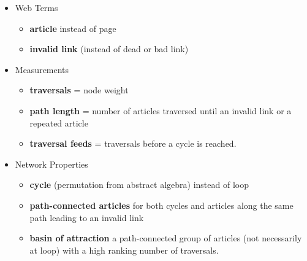 \documentclass[twoside]{article}
\newcommand{\bt}[1]{\textbf{#1}} %
\begin{document}
\begin{itemize}
\item Web Terms
    \begin{itemize}
        \item \bt{article} instead of page
        \item \bt{invalid link} (instead of dead or bad link)
    \end{itemize}
\item Measurements
    \begin{itemize}
        \item \bt{traversals} = node weight
        \item \bt{path length} = number of articles traversed until an invalid link or a repeated article
        \item \bt{traversal feeds} = traversals before a cycle is reached.
    \end{itemize}
\item Network Properties
    \begin{itemize}
        \item \bt{cycle} (permutation from abstract algebra) instead of loop
        \item \bt{path-connected articles} for both cycles and articles along the same path leading to an 
    invalid link
        \item \bt{basin of attraction} a path-connected group of articles (not necessarily at loop) with a high ranking number of traversals.
    \end{itemize}
\end{itemize}
\end{document}
